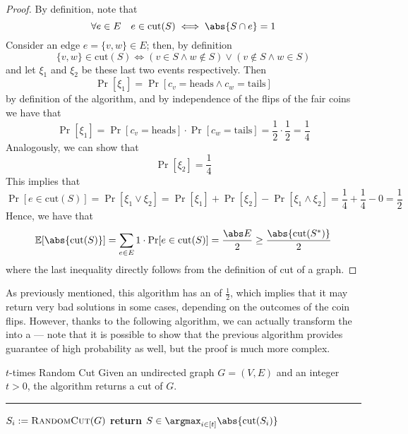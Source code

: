 \documentclass[a4paper, 12pt]{report}
\begin{document}
    \begin{proof}
        By definition, note that $$\forall e \in E \quad e \in \mathrm{cut}(S) \iff \abs{S \cap e} = 1$$ Consider an edge $e = \{v, w\} \in E$; then, by definition $$\{v, w\} \in \mathrm{cut}(S) \iff (v \in S \land w \notin S) \lor (v \notin S \land w \in S)$$ and let $\xi_1$ and $\xi_2$ be these last two events respectively. Then $$\Pr[\xi_1] = \Pr[c_v = \mathrm{heads} \land c_w = \mathrm{tails}]$$ by definition of the algorithm, and by independence of the flips of the fair coins we have that $$\Pr[\xi_1] = \Pr[c_v = \mathrm{heads}] \cdot \Pr[c_w = \mathrm{tails}] = \dfrac{1}{2} \cdot \dfrac{1}{2} = \dfrac{1}{4}$$ Analogously, we can show that $$\Pr[\xi_2] = \dfrac{1}{4}$$ This implies that $$\Pr[e \in \mathrm{cut}(S)] = \Pr[\xi_1 \lor \xi_2] = \Pr[\xi_1] + \Pr[\xi_2] - \Pr[\xi_1 \land \xi_2] = \dfrac{1}{4} + \dfrac{1}{4} - 0 = \dfrac{1}{2}$$ Hence, we have that $$\mathbb E [\abs{\mathrm{cut}(S)}] = \sum_{e \in E}{1 \cdot \Pr[e \in \mathrm{cut}(S)]} = \dfrac{\abs E}{2} \ge \dfrac{\abs{\mathrm{cut}(S^*)}}{2}$$ where the last inequality directly follows from the definition of cut of a graph.
    \end{proof}

    As previously mentioned, this algorithm has an  of $\frac{1}{2}$, which implies that it may return very bad solutions in some cases, depending on the outcomes of the coin flips. However, thanks to the following algorithm, we can actually transform the  into a  --- note that it is possible to show that the previous algorithm provides guarantee of high probability as well, but the proof is much more complex.

    \begin{framedalgo}{$t$-times Random Cut}
        Given an undirected graph $G = (V, E)$ and an integer $t > 0$, the algorithm returns a cut of $G$. \\
        \hrule

        \quad
        \begin{algorithmic}[1]
                    \State $S_i := \textsc{RandomCut}(G)$
                \EndFor
                \State \textbf{return} $S \in \argmax_{i \in [t]}{\abs{\mathrm{cut}(S_i)}}$
            \EndFunction
        \end{algorithmic}
    \end{framedalgo}
\end{document}
